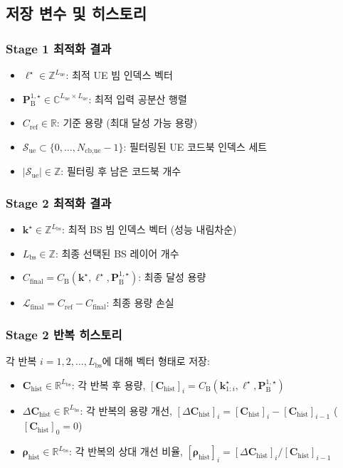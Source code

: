 \documentclass[10pt]{article}
\begin{document}
\subsection{저장 변수 및 히스토리}

\subsubsection{Stage 1 최적화 결과}
\begin{itemize}
    \item $\boldsymbol{\ell}^{\star} \in \mathbb{Z}^{L_{\text{ue}}}$: 최적 UE 빔 인덱스 벡터
    \item $\mathbf{P}_{\text{B}}^{1,\star} \in \mathbb{C}^{L_{\text{ue}} \times L_{\text{ue}}}$: 최적 입력 공분산 행렬
    \item $C_{\text{ref}} \in \mathbb{R}$: 기준 용량 (최대 달성 가능 용량)
    \item $\mathcal{S}_{\text{ue}} \subset \{0, \ldots, N_{\text{cb,ue}}-1\}$: 필터링된 UE 코드북 인덱스 세트
    \item $|\mathcal{S}_{\text{ue}}| \in \mathbb{Z}$: 필터링 후 남은 코드북 개수
\end{itemize}

\subsubsection{Stage 2 최적화 결과}
\begin{itemize}
    \item $\boldsymbol{k}^{\star} \in \mathbb{Z}^{L_{\text{bs}}}$: 최적 BS 빔 인덱스 벡터 (성능 내림차순)
    \item $L_{\text{bs}} \in \mathbb{Z}$: 최종 선택된 BS 레이어 개수
    \item $C_{\text{final}} = C_{\text{B}}(\boldsymbol{k}^{\star}, \boldsymbol{\ell}^{\star}, \mathbf{P}_{\text{B}}^{1,\star})$: 최종 달성 용량
    \item $\mathcal{L}_{\text{final}} = C_{\text{ref}} - C_{\text{final}}$: 최종 용량 손실
\end{itemize}

\subsubsection{Stage 2 반복 히스토리}
각 반복 $i = 1, 2, \ldots, L_{\text{bs}}$에 대해 벡터 형태로 저장:
\begin{itemize}
    \item $\mathbf{C}_{\text{hist}} \in \mathbb{R}^{L_{\text{bs}}}$: 각 반복 후 용량, $[\mathbf{C}_{\text{hist}}]_i = C_{\text{B}}(\boldsymbol{k}^{\star}_{1:i}, \boldsymbol{\ell}^{\star}, \mathbf{P}_{\text{B}}^{1,\star})$
    \item $\Delta \mathbf{C}_{\text{hist}} \in \mathbb{R}^{L_{\text{bs}}}$: 각 반복의 용량 개선, $[\Delta \mathbf{C}_{\text{hist}}]_i = [\mathbf{C}_{\text{hist}}]_i - [\mathbf{C}_{\text{hist}}]_{i-1}$ ($[\mathbf{C}_{\text{hist}}]_0 = 0$)
    \item $\boldsymbol{\rho}_{\text{hist}} \in \mathbb{R}^{L_{\text{bs}}}$: 각 반복의 상대 개선 비율, $[\boldsymbol{\rho}_{\text{hist}}]_i = [\Delta \mathbf{C}_{\text{hist}}]_i / [\mathbf{C}_{\text{hist}}]_{i-1}$
\end{itemize}
\end{document}
